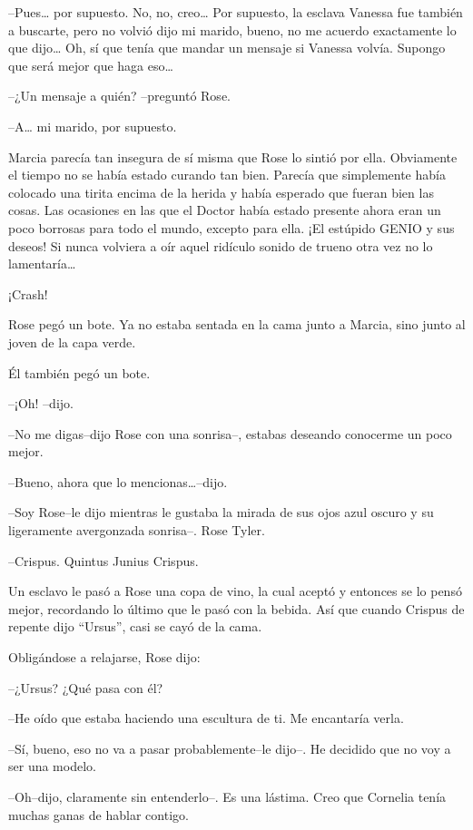 --Pues\ldots{} por supuesto. No, no, creo\ldots{} Por supuesto, la
esclava Vanessa fue también a buscarte, pero no volvió dijo mi marido,
bueno, no me acuerdo exactamente lo que dijo\ldots{} Oh, sí que tenía
que mandar un mensaje si Vanessa volvía. Supongo que será mejor que haga
eso\ldots{}

--¿Un mensaje a quién? --preguntó Rose.

--A\ldots{} mi marido, por supuesto.

Marcia parecía tan insegura de sí misma que Rose lo sintió por ella.
Obviamente el tiempo no se había estado curando tan bien. Parecía que
simplemente había colocado una tirita encima de la herida y había
esperado que fueran bien las cosas. Las ocasiones en las que el Doctor
había estado presente ahora eran un poco borrosas para todo el mundo,
excepto para ella. ¡El estúpido GENIO y sus deseos! Si nunca volviera a
oír aquel ridículo sonido de trueno otra vez no lo lamentaría\ldots{}

¡Crash!

Rose pegó un bote. Ya no estaba sentada en la cama junto a Marcia, sino
junto al joven de la capa verde.

Él también pegó un bote.

--¡Oh! --dijo.

--No me digas--dijo Rose con una sonrisa--, estabas deseando conocerme
un poco mejor.

--Bueno, ahora que lo mencionas\ldots{}--dijo.

--Soy Rose--le dijo mientras le gustaba la mirada de sus ojos azul
oscuro y su ligeramente avergonzada sonrisa--. Rose Tyler.

--Crispus. Quintus Junius Crispus.

Un esclavo le pasó a Rose una copa de vino, la cual aceptó y entonces se
lo pensó mejor, recordando lo último que le pasó con la bebida. Así que
cuando Crispus de repente dijo ``Ursus'', casi se cayó de la cama.

Obligándose a relajarse, Rose dijo:

--¿Ursus? ¿Qué pasa con él?

--He oído que estaba haciendo una escultura de ti. Me encantaría verla.

--Sí, bueno, eso no va a pasar probablemente--le dijo--. He decidido que
no voy a ser una modelo.

--Oh--dijo, claramente sin entenderlo--. Es una lástima. Creo que
Cornelia tenía muchas ganas de hablar contigo.

